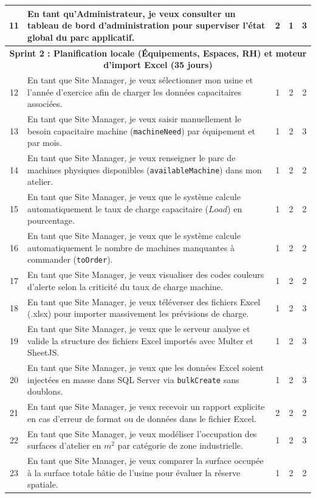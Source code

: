 \begin{longtable}{|c|p{8.8cm}|c|c|c|}
11 & En tant qu'Administrateur, je veux consulter un tableau de bord d'administration pour superviser l'état global du parc applicatif. & 2 & 1 & 3 \\ \hline
\multicolumn{5}{|c|}{\textbf{Sprint 2 : Planification locale (Équipements, Espaces, RH) et moteur d'import Excel (35 jours)}} \\ \hline
12 & En tant que Site Manager, je veux sélectionner mon usine et l'année d'exercice afin de charger les données capacitaires associées. & 1 & 2 & 2 \\ \hline
13 & En tant que Site Manager, je veux saisir manuellement le besoin capacitaire machine (\texttt{machineNeed}) par équipement et par mois. & 1 & 2 & 3 \\ \hline
14 & En tant que Site Manager, je veux renseigner le parc de machines physiques disponibles (\texttt{availableMachine}) dans mon atelier. & 1 & 2 & 2 \\ \hline
15 & En tant que Site Manager, je veux que le système calcule automatiquement le taux de charge capacitaire ($Load$) en pourcentage. & 1 & 2 & 2 \\ \hline
16 & En tant que Site Manager, je veux que le système calcule automatiquement le nombre de machines manquantes à commander (\texttt{toOrder}). & 1 & 2 & 2 \\ \hline
17 & En tant que Site Manager, je veux visualiser des codes couleurs d'alerte selon la criticité du taux de charge machine. & 1 & 2 & 2 \\ \hline
18 & En tant que Site Manager, je veux téléverser des fichiers Excel (.xlsx) pour importer massivement les prévisions de charge. & 1 & 2 & 3 \\ \hline
19 & En tant que Site Manager, je veux que le serveur analyse et valide la structure des fichiers Excel importés avec Multer et SheetJS. & 1 & 2 & 3 \\ \hline
20 & En tant que Site Manager, je veux que les données Excel soient injectées en masse dans SQL Server via \texttt{bulkCreate} sans doublons. & 1 & 2 & 3 \\ \hline
21 & En tant que Site Manager, je veux recevoir un rapport explicite en cas d'erreur de format ou de données dans le fichier Excel. & 2 & 2 & 2 \\ \hline
22 & En tant que Site Manager, je veux modéliser l'occupation des surfaces d'atelier en $m^2$ par catégorie de zone industrielle. & 1 & 2 & 3 \\ \hline
23 & En tant que Site Manager, je veux comparer la surface occupée à la surface totale bâtie de l'usine pour évaluer la réserve spatiale. & 1 & 2 & 2 \\ \hline

\end{longtable}
